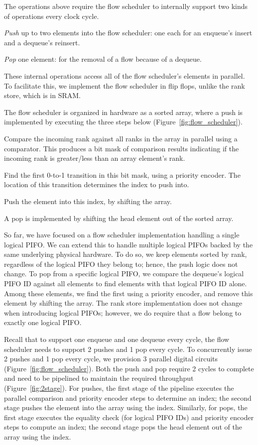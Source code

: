 The operations above require the flow scheduler to internally support two kinds
of operations every clock cycle.
\begin{CompactEnumerate}
\item {\em Push} up to two elements into the flow scheduler: one each for an
  enqueue's insert and a dequeue's reinsert.
\item {\em Pop} one element: for the removal of a flow because of a dequeue.
\end{CompactEnumerate}
These internal operations access all of the flow scheduler's elements in
parallel. To facilitate this, we implement the flow scheduler in flip flops,
unlike the rank store, which is in SRAM.

The flow scheduler is organized in hardware as a sorted array, where a push is
implemented by executing the three steps below
(Figure~\ref{fig:flow_scheduler}).
\begin{CompactEnumerate}
\item Compare the incoming rank against all ranks in the array in parallel using a comparator.
  This produces a bit mask of comparison results indicating if the incoming rank
  is greater/less than an array element's rank.
\item Find the first 0-to-1 transition in this bit mask, using a priority encoder. The location of this transition determines the index to push into.
\item Push the element into this index, by shifting the array.
\end{CompactEnumerate}
A pop is implemented by shifting the head element out of the sorted array.

So far, we have focused on a flow scheduler implementation handling a single
logical PIFO. We can extend this to handle multiple logical PIFOs backed by the
same underlying physical hardware. To do so, we keep elements sorted by rank,
regardless of the logical PIFO they belong to; hence, the push logic does not
change.  To pop from a specific logical PIFO, we compare the dequeue's logical
PIFO ID against all elements to find elements with that logical PIFO ID alone.
Among these elements, we find the first using a priority encoder, and remove
this element by shifting the array.  The rank store implementation does not
change when introducing logical PIFOs; however, we do require that a flow
belong to exactly one logical PIFO.

Recall that to support one enqueue and one dequeue every cycle, the flow
scheduler needs to support 2 pushes and 1 pop every cycle. To concurrently
issue 2 pushes and 1 pop every cycle, we provision 3 parallel digital circuits
(Figure~\ref{fig:flow_scheduler}). Both the push and pop require 2 cycles to
complete and need to be pipelined to maintain the required throughput
(Figure~\ref{fig:2stage}). For pushes, the first stage of the pipeline executes
the parallel comparison and priority encoder steps to determine an index; the
second stage pushes the element into the array using the index.  Similarly, for
pops, the first stage executes the equality check (for logical PIFO IDs) and
priority encoder steps to compute an index; the second stage pops the head
element out of the array using the index.

